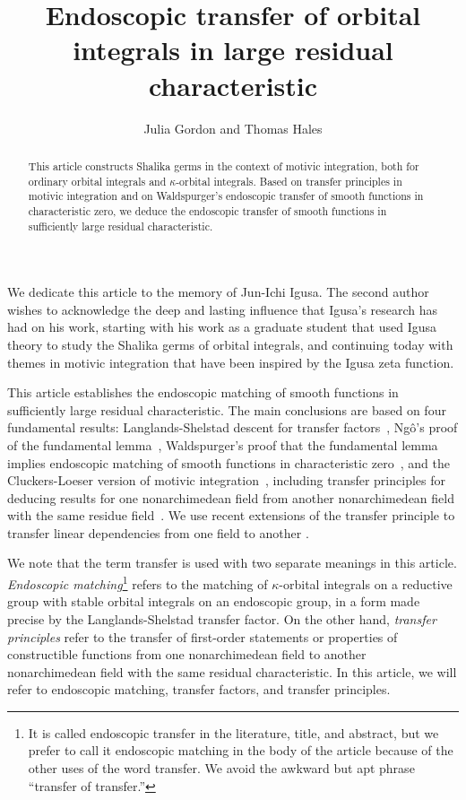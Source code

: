 \documentclass[12pt]{amsart}
\title{Endoscopic transfer of orbital integrals in large residual characteristic}
\author{Julia Gordon and Thomas Hales}
\theoremstyle{plain}
\theoremstyle{definition}
\begin{document}
\begin{abstract} This article constructs Shalika germs in the context
  of motivic integration, both for ordinary orbital integrals and
  $\kappa$-orbital integrals.  Based on transfer principles in motivic
  integration and on Waldspurger's endoscopic transfer of smooth
  functions in characteristic zero, we deduce the endoscopic
  transfer of smooth functions in sufficiently large residual
  characteristic.
\end{abstract}



\maketitle


We dedicate this article to the memory of Jun-Ichi Igusa.  The second
author wishes to acknowledge the deep and lasting influence that
Igusa's research has had on his work, starting with his work as a
graduate student that used Igusa theory to study the Shalika germs of
orbital integrals, and continuing today with themes in motivic
integration that have been inspired by the Igusa zeta function.

\bigskip

This article establishes the endoscopic matching of smooth functions
in sufficiently large residual characteristic.  The main conclusions
are based on four fundamental results: Langlands-Shelstad descent for
transfer factors~\cite{LSxf}, Ng\^o's proof of the fundamental
lemma~\cite{ngo2010lemme}, Waldspurger's proof that the fundamental
lemma implies endoscopic matching of smooth functions in
characteristic zero~\cite{waldspurger1997lemme}, and the
Cluckers-Loeser version of motivic integration~\cite{CL}, including
transfer principles for deducing results for one nonarchimedean field
from another nonarchimedean field with the same residue
field~\cite{CLe}.  We use recent extensions of the transfer principle
to transfer linear dependencies from one field to another \cite{CGH2}.

We note that the term transfer is used with two separate meanings in
this article.  {\it Endoscopic matching}\footnote{It is called
  endoscopic transfer in the literature, title, and abstract, but we
  prefer to call it endoscopic matching in the body of the article
  because of the other uses of the word transfer. We avoid the awkward
  but apt phrase ``transfer of transfer.''}  refers to the matching of
$\kappa$-orbital integrals on a reductive group with stable orbital
integrals on an endoscopic group, in a form made precise by the
Langlands-Shelstad transfer factor.  On the other hand, {\it transfer
  principles} refer to the transfer of first-order statements or
properties of constructible functions from one nonarchimedean field to
another nonarchimedean field with the same residual characteristic.  In
this article, we will refer to endoscopic matching, transfer factors,
and transfer principles.
\end{document}
